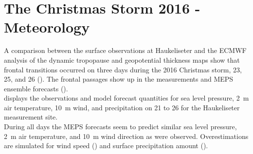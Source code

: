 \section{The Christmas Storm 2016 - Meteorology}\label{sec:res:large_scale_sfc}
A comparison between the surface observations at Haukeliseter and the ECMWF analysis of the dynamic tropopause and geopotential thickness maps show that frontal transitions occurred on three days during the 2016 Christmas storm, \num{23}, \num{25}, and \SI{26}{\dec} (). The frontal passages show up in the measurements and MEPS ensemble forecasts ().
\\
 displays the observations and model forecast quantities for sea level pressure, \SI{2}{\metre} air temperature, \SI{10}{\metre} wind, and precipitation on \num{21} to \SI{26}{\dec} for the Haukeliseter measurement site. 
\\
During all days the MEPS forecasts seem to predict similar sea level pressure, \SI{2}{\metre} air temperature, and \SI{10}{\metre} wind direction as were observed. Overestimations are simulated for wind speed () and surface precipitation amount ().
